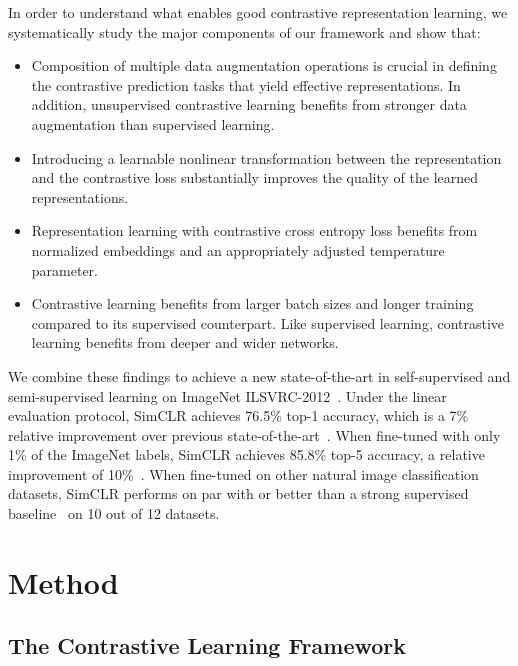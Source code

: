\documentclass{article}
\begin{document}
In order to understand what enables good contrastive representation learning, we systematically study the major components of our framework and show that:
\begin{itemize}[topsep=0pt, partopsep=0pt, leftmargin=13pt, parsep=0pt, itemsep=4pt]
    \item Composition of multiple data augmentation operations is crucial in defining the contrastive prediction tasks that yield effective representations. In addition, unsupervised contrastive learning benefits from stronger data augmentation than supervised learning.
    \item Introducing a learnable nonlinear transformation between the representation and the contrastive loss substantially improves the quality of the learned representations.
    \item Representation learning with contrastive cross entropy loss benefits from normalized embeddings and an appropriately adjusted temperature parameter.
    \item Contrastive learning benefits from larger batch sizes and longer training compared to its supervised counterpart. Like supervised learning, contrastive learning benefits from deeper and wider networks.
\end{itemize}

We combine these findings to achieve a new state-of-the-art in self-supervised and semi-supervised learning on ImageNet ILSVRC-2012~\cite{russakovsky2015imagenet}. 
Under the linear evaluation protocol, SimCLR achieves 76.5\% top-1 accuracy, which is a 7\% relative improvement over previous state-of-the-art~\cite{henaff2019data}.
When fine-tuned with only 1\% of the ImageNet labels, SimCLR achieves 85.8\% top-5 accuracy, a relative improvement of 10\%~\cite{henaff2019data}.
When fine-tuned on other natural image classification datasets, SimCLR performs on par with or better than a strong supervised baseline~\cite{kornblith2019better} on 10 out of 12 datasets. \section{Method}
\subsection{The Contrastive Learning Framework}
\end{document}
